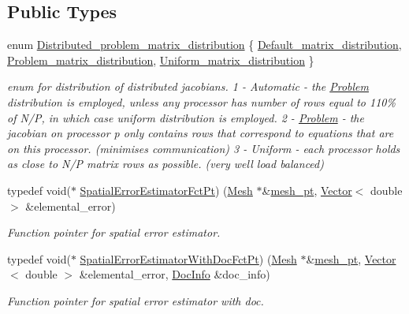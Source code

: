\subsection*{Public Types}
\begin{DoxyCompactItemize}
\item 
enum \hyperlink{classoomph_1_1Problem_a8fc1f40f2a9309e9ff02772fa2258402}{Distributed\+\_\+problem\+\_\+matrix\+\_\+distribution} \{ \hyperlink{classoomph_1_1Problem_a8fc1f40f2a9309e9ff02772fa2258402ad7503f3fef4bc3556497018171c820e6}{Default\+\_\+matrix\+\_\+distribution}, 
\hyperlink{classoomph_1_1Problem_a8fc1f40f2a9309e9ff02772fa2258402aed8521359adcaf514039424b29893796}{Problem\+\_\+matrix\+\_\+distribution}, 
\hyperlink{classoomph_1_1Problem_a8fc1f40f2a9309e9ff02772fa2258402a741cb51275fde6a02373b2ffacf1273f}{Uniform\+\_\+matrix\+\_\+distribution}
 \}\begin{DoxyCompactList}\small\item\em enum for distribution of distributed jacobians. 1 -\/ Automatic -\/ the \hyperlink{classoomph_1_1Problem}{Problem} distribution is employed, unless any processor has number of rows equal to 110\% of N/P, in which case uniform distribution is employed. 2 -\/ \hyperlink{classoomph_1_1Problem}{Problem} -\/ the jacobian on processor p only contains rows that correspond to equations that are on this processor. (minimises communication) 3 -\/ Uniform -\/ each processor holds as close to N/P matrix rows as possible. (very well load balanced) \end{DoxyCompactList}
\item 
typedef void($\ast$ \hyperlink{classoomph_1_1Problem_a638b525d7cae45e56160e3c282c8ad09}{Spatial\+Error\+Estimator\+Fct\+Pt}) (\hyperlink{classoomph_1_1Mesh}{Mesh} $\ast$\&\hyperlink{classoomph_1_1Problem_aad122d70a22dc5302cfd5853d3cf3057}{mesh\+\_\+pt}, \hyperlink{classoomph_1_1Vector}{Vector}$<$ double $>$ \&elemental\+\_\+error)
\begin{DoxyCompactList}\small\item\em Function pointer for spatial error estimator. \end{DoxyCompactList}\item 
typedef void($\ast$ \hyperlink{classoomph_1_1Problem_a220abfde16b8b1b544b4127e0e4cc9e4}{Spatial\+Error\+Estimator\+With\+Doc\+Fct\+Pt}) (\hyperlink{classoomph_1_1Mesh}{Mesh} $\ast$\&\hyperlink{classoomph_1_1Problem_aad122d70a22dc5302cfd5853d3cf3057}{mesh\+\_\+pt}, \hyperlink{classoomph_1_1Vector}{Vector}$<$ double $>$ \&elemental\+\_\+error, \hyperlink{classoomph_1_1DocInfo}{Doc\+Info} \&doc\+\_\+info)
\begin{DoxyCompactList}\small\item\em Function pointer for spatial error estimator with doc. \end{DoxyCompactList}\end{DoxyCompactItemize}
